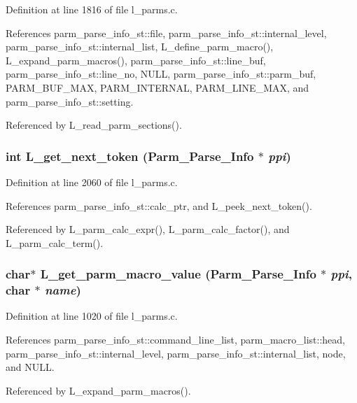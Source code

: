Definition at line 1816 of file l\_\-parms.c.

References parm\_\-parse\_\-info\_\-st::file, parm\_\-parse\_\-info\_\-st::internal\_\-level, parm\_\-parse\_\-info\_\-st::internal\_\-list, L\_\-define\_\-parm\_\-macro(), L\_\-expand\_\-parm\_\-macros(), parm\_\-parse\_\-info\_\-st::line\_\-buf, parm\_\-parse\_\-info\_\-st::line\_\-no, NULL, parm\_\-parse\_\-info\_\-st::parm\_\-buf, PARM\_\-BUF\_\-MAX, PARM\_\-INTERNAL, PARM\_\-LINE\_\-MAX, and parm\_\-parse\_\-info\_\-st::setting.

Referenced by L\_\-read\_\-parm\_\-sections().
\subsubsection{\setlength{\rightskip}{0pt plus 5cm}int L\_\-get\_\-next\_\-token (\bf{Parm\_\-Parse\_\-Info} $\ast$ {\em ppi})}\label{l__parms_8c_a72a0feb27cdbf381044fe530f4b537f}




Definition at line 2060 of file l\_\-parms.c.

References parm\_\-parse\_\-info\_\-st::calc\_\-ptr, and L\_\-peek\_\-next\_\-token().

Referenced by L\_\-parm\_\-calc\_\-expr(), L\_\-parm\_\-calc\_\-factor(), and L\_\-parm\_\-calc\_\-term().
\subsubsection{\setlength{\rightskip}{0pt plus 5cm}char$\ast$ L\_\-get\_\-parm\_\-macro\_\-value (\bf{Parm\_\-Parse\_\-Info} $\ast$ {\em ppi}, char $\ast$ {\em name})}\label{l__parms_8c_75a69937f386bd87ddd760e0437f601e}




Definition at line 1020 of file l\_\-parms.c.

References parm\_\-parse\_\-info\_\-st::command\_\-line\_\-list, parm\_\-macro\_\-list::head, parm\_\-parse\_\-info\_\-st::internal\_\-level, parm\_\-parse\_\-info\_\-st::internal\_\-list, node, and NULL.

Referenced by L\_\-expand\_\-parm\_\-macros().
